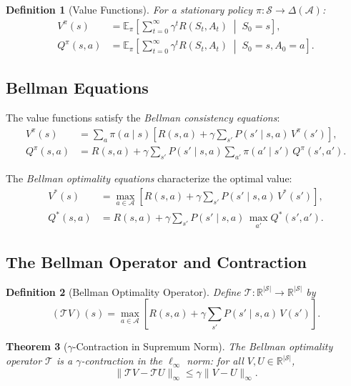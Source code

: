\documentclass[11pt,a4paper]{article}
\newtheorem{theorem}{Theorem}[section]
\newtheorem{definition}[theorem]{Definition}
\newcommand{\E}{\mathbb{E}}
\newcommand{\R}{\mathbb{R}}
\newcommand{\cS}{\mathcal{S}}
\newcommand{\cA}{\mathcal{A}}
\newcommand{\cT}{\mathcal{T}}
\newcommand{\Vpi}{V^{\pi}}
\newcommand{\Qpi}{Q^{\pi}}
\newcommand{\Vstar}{V^{*}}
\newcommand{\Qstar}{Q^{*}}
\begin{document}
\begin{definition}[Value Functions]
For a stationary policy $\pi : \cS \to \Delta(\cA)$:
\begin{align}
  \Vpi(s) &= \E_\pi\!\left[\sum_{t=0}^\infty \gamma^t R(S_t, A_t) \;\middle|\; S_0 = s\right], \label{eq:vpi} \\
  \Qpi(s, a) &= \E_\pi\!\left[\sum_{t=0}^\infty \gamma^t R(S_t, A_t) \;\middle|\; S_0 = s, A_0 = a\right]. \label{eq:qpi}
\end{align}
\end{definition}

\subsection{Bellman Equations}

The value functions satisfy the \emph{Bellman consistency equations}:
\begin{align}
  \Vpi(s) &= \sum_{a} \pi(a \mid s) \left[ R(s,a) + \gamma \sum_{s'} P(s' \mid s, a)\, \Vpi(s') \right], \label{eq:bellman-v}\\
  \Qpi(s,a) &= R(s,a) + \gamma \sum_{s'} P(s' \mid s, a) \sum_{a'} \pi(a' \mid s')\, \Qpi(s', a'). \label{eq:bellman-q}
\end{align}

The \emph{Bellman optimality equations} characterize the optimal value:
\begin{align}
  \Vstar(s) &= \max_{a \in \cA} \left[ R(s,a) + \gamma \sum_{s'} P(s' \mid s, a)\, \Vstar(s') \right], \label{eq:bellman-opt-v}\\
  \Qstar(s,a) &= R(s,a) + \gamma \sum_{s'} P(s' \mid s, a)\, \max_{a'} \Qstar(s', a'). \label{eq:bellman-opt-q}
\end{align}

\subsection{The Bellman Operator and Contraction}

\begin{definition}[Bellman Optimality Operator]
Define $\cT : \R^{|\cS|} \to \R^{|\cS|}$ by
\[
  (\cT V)(s) = \max_{a \in \cA} \left[ R(s,a) + \gamma \sum_{s'} P(s' \mid s, a)\, V(s') \right].
\]
\end{definition}

\begin{theorem}[$\gamma$-Contraction in Supremum Norm]
\label{thm:contraction}
The Bellman optimality operator $\cT$ is a $\gamma$-contraction in the
$\ell_\infty$ norm: for all $V, U \in \R^{|\cS|}$,
\[
  \|\cT V - \cT U\|_\infty \leq \gamma \|V - U\|_\infty.
\]
\end{theorem}
\end{document}
